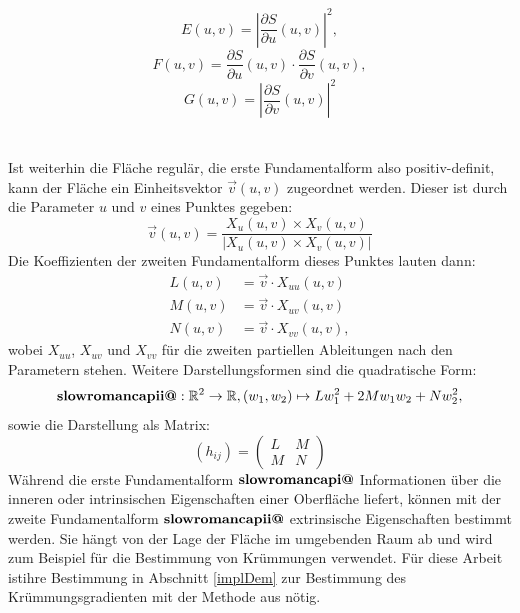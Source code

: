 \documentclass{paperStyle}
\makeatletter
\newcommand{\Rmnum}[1]{\textbf{\expandafter\@slowromancap\romannumeral #1@}}
\makeatother
\begin{document}
\begin{equation}
E(u,v) = |\frac{\partial S}{\partial u}(u,v)|^{2},
\end{equation}	
\begin{equation}
F(u,v) = \frac{\partial S}{\partial u}(u,v) \cdot \frac{\partial S}{\partial v}(u,v),
\end{equation}	
\begin{equation}
G(u,v) = |\frac{\partial S}{\partial v}(u,v)|^{2}
\end{equation}	
\\
\\	
Ist weiterhin die Fläche regulär, die erste Fundamentalform also positiv-definit, kann der Fläche ein Einheitsvektor $\vec{v}(u,v)$ zugeordnet werden. Dieser ist durch die Parameter $u$ und $v$ eines Punktes gegeben:
\begin{equation}
	\vec{v}(u,v)=\frac{X_u(u,v)\times X_v(u,v)}{|X_u(u,v)\times X_v(u,v)|}
\end{equation}
Die Koeffizienten der zweiten Fundamentalform dieses Punktes lauten dann:
\begin{equation}
	\begin{split}
	L(u,v)&= \vec{v} \cdot X_{uu}(u,v)\\
	M(u,v)&= \vec{v} \cdot X_{uv}(u,v)\\
	N(u,v)&= \vec{v} \cdot X_{vv}(u,v),
	\end{split}
\end{equation}
wobei $X_{uu}$, $X_{uv}$ und $X_{vv}$ für die zweiten partiellen Ableitungen nach den Parametern stehen. 
Weitere Darstellungsformen sind die quadratische Form:
\begin{equation}
	\Rmnum{2}: \mathbb{R}^2 \rightarrow \mathbb{R}, (w_1, w_2) \mapsto Lw_1^2+2 M w_1 w_2 + Nw_2^2,
\end{equation}
sowie die Darstellung als Matrix:
\begin{equation}
	(h_{ij}) = \begin{pmatrix}
	L & M \\
	M & N
	\end{pmatrix}
\end{equation}
Während die erste Fundamentalform $\Rmnum{1}$ Informationen über die inneren oder intrinsischen Eigenschaften einer Oberfläche liefert, können mit der zweite Fundamentalform $\Rmnum{2}$ extrinsische Eigenschaften bestimmt werden. Sie hängt von der Lage der Fläche im umgebenden Raum ab und wird zum Beispiel für die Bestimmung von Krümmungen verwendet. Für diese Arbeit istihre Bestimmung in Abschnitt \ref{implDem} zur Bestimmung des Krümmungsgradienten mit der Methode aus \cite{CurvDeriv2004} nötig.  
\end{document}
